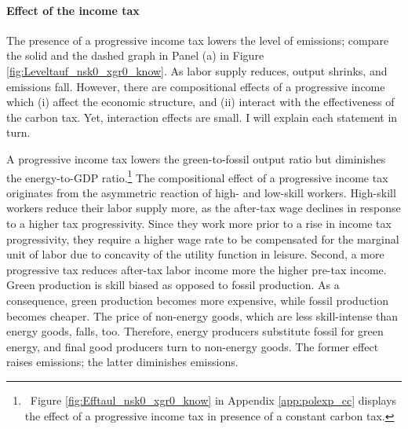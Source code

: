 \paragraph{Effect of the income tax}
 
 The presence of a progressive income tax lowers the level of emissions; compare the solid and the dashed graph in Panel (a) in Figure \ref{fig:Leveltauf_nsk0_xgr0_know}. As labor supply reduces, output shrinks, and emissions fall. 
 However, there are compositional effects of a progressive income which (i) affect the economic structure, and (ii) interact with the effectiveness of the carbon tax. Yet, interaction effects are small. I will explain each statement in turn. 
 
 A progressive income tax lowers the green-to-fossil output ratio but diminishes the energy-to-GDP ratio.\footnote{\ Figure \ref{fig:Efftaul_nsk0_xgr0_know} in Appendix \ref{app:polexp_cc} displays the effect of a progressive income tax in presence of a constant carbon tax. }
 The compositional effect of a progressive income tax originates from the asymmetric reaction of high- and low-skill workers. High-skill workers reduce their labor supply more, as the after-tax wage declines in response to a higher tax progressivity. Since they work more prior to a rise in income tax progressivity, they require a higher wage rate to be compensated for the marginal unit of labor due to concavity of the utility function in leisure. Second, a more progressive tax reduces after-tax labor income more the higher pre-tax income. %
 Green production is skill biased as opposed to fossil production.
 As a  consequence, green production becomes more expensive, while fossil production becomes cheaper. The price of non-energy goods, which are less skill-intense than energy goods, falls, too. Therefore, energy producers substitute fossil for green energy, and final good producers turn to non-energy goods. The former effect raises emissions; the latter diminishes emissions.
 
